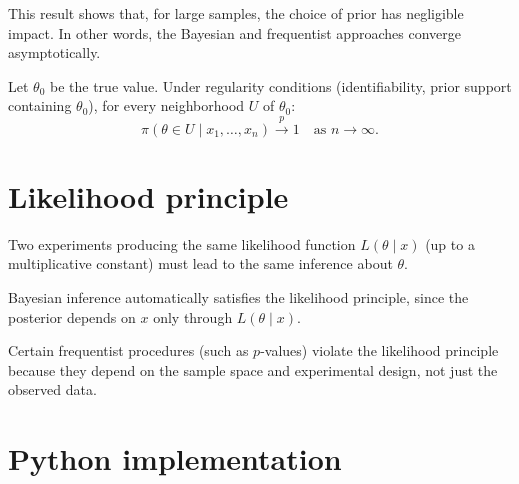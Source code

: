 \begin{remark}
This result shows that, for large samples, the choice of prior has
negligible impact. In other words, the Bayesian and frequentist
approaches converge asymptotically.
\end{remark}

\begin{theorem}
Let $\theta_0$ be the true value. Under regularity conditions
(identifiability, prior support containing $\theta_0$), for every
neighborhood $U$ of $\theta_0$:
\[
  \pi(\theta \in U \mid x_1, \ldots, x_n) \xrightarrow{p} 1
  \quad \text{as } n \to \infty.
\]
\end{theorem}

\section{Likelihood principle}

\begin{definition}
Two experiments producing the same likelihood function
$L(\theta \mid x)$ (up to a multiplicative constant) must lead to the
same inference about $\theta$.
\end{definition}

\begin{proposition}
Bayesian inference automatically satisfies the likelihood principle,
since the posterior depends on $x$ only through $L(\theta \mid x)$.
\end{proposition}

\begin{warning}[title=\textbf{Frequentist violation}]
Certain frequentist procedures (such as $p$-values) violate the
likelihood principle because they depend on the sample space and
experimental design, not just the observed data.
\end{warning}

\section{Python implementation}

